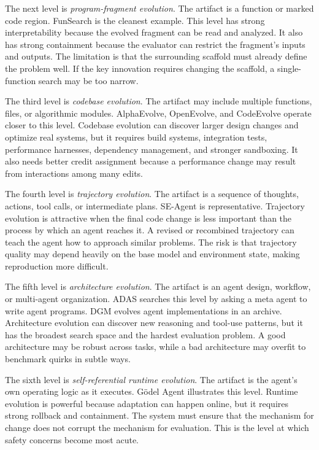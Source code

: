 The next level is \emph{program-fragment evolution}.  The artifact is a function or marked code region.  FunSearch is the cleanest example.  This level has strong interpretability because the evolved fragment can be read and analyzed.  It also has strong containment because the evaluator can restrict the fragment's inputs and outputs.  The limitation is that the surrounding scaffold must already define the problem well.  If the key innovation requires changing the scaffold, a single-function search may be too narrow.

The third level is \emph{codebase evolution}.  The artifact may include multiple functions, files, or algorithmic modules.  AlphaEvolve, OpenEvolve, and CodeEvolve operate closer to this level.  Codebase evolution can discover larger design changes and optimize real systems, but it requires build systems, integration tests, performance harnesses, dependency management, and stronger sandboxing.  It also needs better credit assignment because a performance change may result from interactions among many edits.

The fourth level is \emph{trajectory evolution}.  The artifact is a sequence of thoughts, actions, tool calls, or intermediate plans.  SE-Agent is representative.  Trajectory evolution is attractive when the final code change is less important than the process by which an agent reaches it.  A revised or recombined trajectory can teach the agent how to approach similar problems.  The risk is that trajectory quality may depend heavily on the base model and environment state, making reproduction more difficult.

The fifth level is \emph{architecture evolution}.  The artifact is an agent design, workflow, or multi-agent organization.  ADAS searches this level by asking a meta agent to write agent programs.  DGM evolves agent implementations in an archive.  Architecture evolution can discover new reasoning and tool-use patterns, but it has the broadest search space and the hardest evaluation problem.  A good architecture may be robust across tasks, while a bad architecture may overfit to benchmark quirks in subtle ways.

The sixth level is \emph{self-referential runtime evolution}.  The artifact is the agent's own operating logic as it executes.  G{\"o}del Agent illustrates this level.  Runtime evolution is powerful because adaptation can happen online, but it requires strong rollback and containment.  The system must ensure that the mechanism for change does not corrupt the mechanism for evaluation.  This is the level at which safety concerns become most acute.

